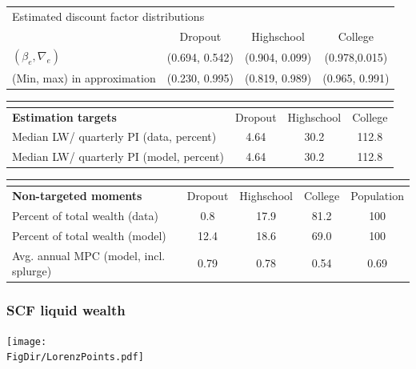 \documentclass[pdflatex]{beamer}
\begin{document}
{	\begin{frame}
		\begin{tabular}{lccc}
		\multicolumn{4}{l}{Estimated discount factor distributions} \\ 
		& Dropout & Highschool & College \\ \midrule
		$(\beta_e, \nabla_e)$ & (0.694, 0.542) & (0.904, 0.099) & (0.978,0.015) \\
		(Min, max) in approximation & (0.230, 0.995) & (0.819, 0.989) & (0.965, 0.991) \\
		\midrule 
		\end{tabular} 
		\begin{tabular}{lccc}
		\multicolumn{4}{l}{ } \\ \midrule
		\textbf{Estimation targets} & Dropout & Highschool & College \\ \midrule
		Median LW/ quarterly PI (data, percent) & 4.64 & 30.2 & 112.8 \\ 
		Median LW/ quarterly PI (model, percent) & 4.64 & 30.2 & 112.8 %
		\\ \midrule 
		\end{tabular} 
		\begin{tabular}{lcccc}
		\multicolumn{5}{l}{ } \\ \midrule
		\textbf{Non-targeted moments} & Dropout & Highschool & College & Population \\ \midrule
		Percent of total wealth (data) & 0.8 & 17.9 & 81.2 & 100 \\
		Percent of total wealth (model) & 12.4 & 18.6 & 69.0 & 100 \\
		Avg. annual MPC (model, incl. splurge) & 0.79 & 0.78 & 0.54 & 0.69
		\\ \bottomrule 
		\end{tabular}
	\end{frame}
	
	
	
	
	\begin{frame}
		\frametitle{SCF liquid wealth}
		\centering
		\texttt{[image: \\FigDir/LorenzPoints.pdf]}
	\end{frame}

}{}
\end{document}
